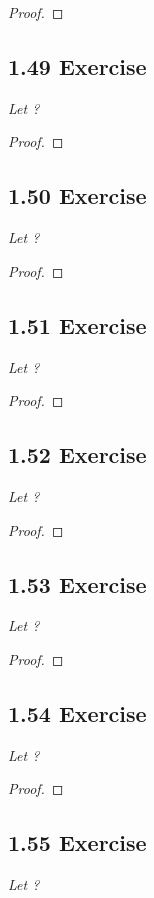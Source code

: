 \documentclass{article}
\begin{document}
\begin{proof}
\end{proof}

\subsection*{1.49 Exercise} 
\quad \textit{Let ?}

\begin{proof}
\end{proof}

\subsection*{1.50 Exercise} 
\quad \textit{Let ?}

\begin{proof}
\end{proof}

\subsection*{1.51 Exercise} 
\quad \textit{Let ?}

\begin{proof}
\end{proof}

\subsection*{1.52 Exercise} 
\quad \textit{Let ?}

\begin{proof}
\end{proof}

\subsection*{1.53 Exercise} 
\quad \textit{Let ?}

\begin{proof}
\end{proof}

\subsection*{1.54 Exercise} 
\quad \textit{Let ?}

\begin{proof}
\end{proof}

\subsection*{1.55 Exercise} 
\quad \textit{Let ?}
\end{document}
